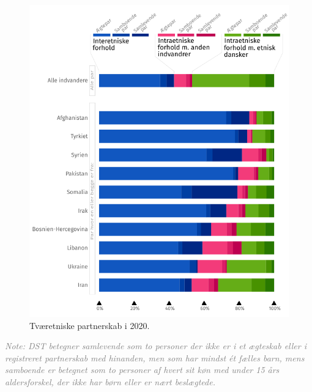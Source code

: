 \documentclass[
]{book}
\begin{document}
\newpage

\begin{figure}
\includegraphics[width=1\linewidth]{images/figur_intergruppepartnerskaber_2020} \caption{Tværetniske partnerskab i 2020.}\label{fig:fig-2-2}
\end{figure}

\begin{footnotesize}\textit{\textcolor{gray}{
Note: DST betegner samlevende som to personer der ikke er i et ægteskab eller i registreret partnerskab med hinanden, men som har mindst ét fælles barn, mens samboende er betegnet som to personer af hvert sit køn med under 15 års aldersforskel, der ikke har børn eller er nært beslægtede.
}}
\end{footnotesize}
\end{document}
